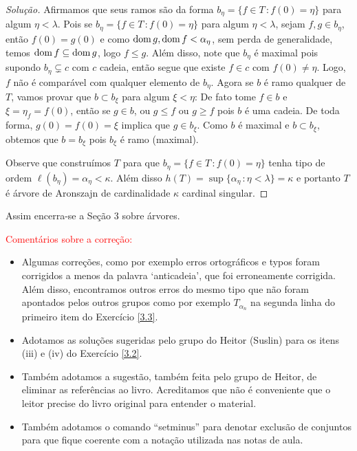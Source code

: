 \documentclass[a4paper]{article}
\begin{document}
\begin{proof}[Solução]
 Afirmamos que seus ramos são da forma \(b_\eta=\{f\in T\,\colon f(0)=\eta\}\) para algum
 \(\eta<\lambda\). Pois se \mbox{\(b_\eta=\{f\in T\,\colon f(0)=\eta\}\)} para algum
 \(\eta<\lambda\), sejam \(f,g\in b_\eta\), então \(f(0)=g(0)\) e como
 \(\operatorname{dom} g,\operatorname{dom} f<\alpha_\eta\), sem perda de generalidade,
 temos \(\operatorname{dom} f\subseteq\operatorname{dom} g\), logo \(f\leq g\). Além disso,
 note que \(b_\eta\) é
 maximal pois supondo \(b_\eta\subsetneq c\) com \(c\) cadeia, então segue que existe
 \(f\in c\) com \(f(0)\neq\eta\). Logo, \(f\) não é comparável com qualquer
 elemento de \(b_\eta\). Agora se \(b\) é ramo qualquer de \(T\), vamos provar
 que \(b\subset b_\xi\) para algum \(\xi<\eta\): De fato tome \(f\in b\) e
 \(\xi= \eta_f=f(0)\), então se \(g\in b\), ou \(g\leq f\) ou \(g\geq f\)
 pois  \(b\) é uma cadeia. De toda forma, \(g(0)=f(0)=\xi\) implica que \( g\in
 b_\xi\). Como \(b\) é maximal e \(b\subset b_\xi\), obtemos que \(b=b_\xi\) pois
 \(b_\xi\) é ramo (maximal). 
 
 Observe que construímos \(T\) para que \(b_\eta=\{f\in T\,\colon f(0)=\eta\}\) tenha
 tipo de ordem \(\ell(b_\eta)=\alpha_\eta<\kappa\). Além disso
 \(h(T)=\sup\{\alpha_\eta\,\colon\eta<\lambda\}=\kappa\) e portanto \(T\) é
 árvore de Aronszajn de cardinalidade \(\kappa\) cardinal singular.\qedhere
 
\end{proof}

Assim encerra-se a Seção 3 sobre árvores.
  
  
  \textcolor{red}{Comentários sobre a correção:}
  \begin{itemize}
    \item Algumas correções, como por exemplo erros ortográficos e typos foram
      corrigidos a menos da palavra `anticadeia', que foi erroneamente
      corrigida. Além disso, encontramos outros erros do mesmo tipo que não
      foram apontados pelos outros grupos como por exemplo \(T_{\alpha_n}\) na segunda linha
      do primeiro item do Exercício \ref{3.3}.
      \item Adotamos as soluções sugeridas pelo grupo do Heitor (Suslin) para os
        itens (iii) e (iv) do Exercício \ref{3.2}.
      \item Também adotamos a sugestão, também feita pelo grupo de Heitor, de
        eliminar as referências ao livro. Acreditamos que não é conveniente que
        o leitor precise do livro original para entender o material.
      \item Também adotamos o comando ``setminus'' para denotar exclusão de
        conjuntos para que fique coerente com a notação utilizada nas notas de aula.
  \end{itemize}
\end{document}
